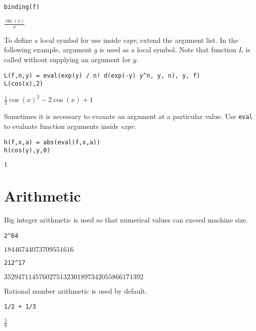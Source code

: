 \documentclass[12pt]{article}
\begin{document}
{\color{blue}
\begin{verbatim}
binding(f)
\end{verbatim}}

$\displaystyle \frac{\sin(x)}{x}$

\bigskip
To define a local symbol for use inside {\it expr}, extend the argument list.
In the following example, argument $y$ is used as a local symbol.
Note that function $L$ is called without supplying an argument for $y$.

{\color{blue}
\begin{verbatim}
L(f,n,y) = eval(exp(y) / n! d(exp(-y) y^n, y, n), y, f)
L(cos(x),2)
\end{verbatim}
}

$\displaystyle \tfrac{1}{2}\cos(x)^2-2\cos(x)+1$

\bigskip
Sometimes it is necessary to evauate an argument at a particular value.
Use \verb$eval$ to evaluate function arguments inside {\it expr}.

{\color{blue}
\begin{verbatim}
h(f,x,a) = abs(eval(f,x,a))
h(cos(y),y,0)
\end{verbatim}}

$1$

\newpage

\section{Arithmetic}

Big integer arithmetic is used so that numerical values can
exceed machine size.

{\color{blue}
\begin{verbatim}
2^64
\end{verbatim}
}

$\displaystyle 18446744073709551616$

{\color{blue}
\begin{verbatim}
212^17
\end{verbatim}
}

$\displaystyle 3529471145760275132301897342055866171392$

\bigskip

Rational number arithmetic is used by default.

{\color{blue}
\begin{verbatim}
1/2 + 1/3
\end{verbatim}
}

$\displaystyle \tfrac{5}{6}$

\bigskip
\end{document}
